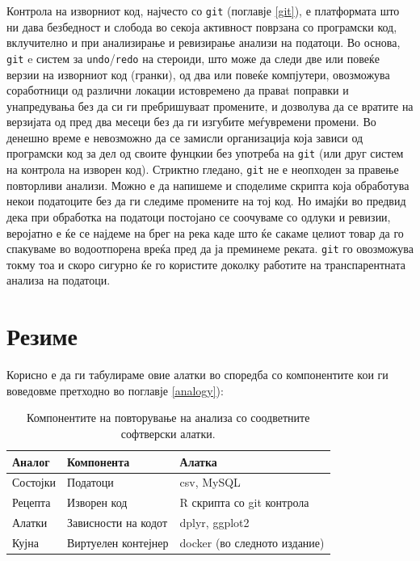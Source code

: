 \documentclass[
]{book}
\begin{document}
Контрола на изворниот код, најчесто со \texttt{git} (поглавје \ref{git}), е платформата што ни дава безбедност и слобода во секоја активност поврзана со програмски код, вклучително и при анализирање и ревизирање анализи на податоци. Во основа, \texttt{git} e систем за \texttt{undo}/\texttt{redo} на стероиди, што може да следи две или повеќе верзии на изворниот код (гранки), од два или повеќе компјутери, овозможува соработници од различни локации истовремено да праваt поправки и унапредувања без да си ги пребришуваат промените, и дозволува да се вратите на верзијата од пред два месеци без да ги изгубите меѓувремени промени. Во денешно време е невозможно да се замисли организација која зависи од програмски код за дел од своите фунцкии без употреба на \texttt{git} (или друг систем на контрола на изворен код). Стриктно гледано, \texttt{git} не е неопходен за правење повторливи анализи. Можно е да напишеме и споделиме скрипта која обработува некои податоците без да ги следиме промените на тој код. Но имајќи во предвид дека при обработка на податоци постојано се соочуваме со одлуки и ревизии, веројатно е ќе се најдеме на брег на река каде што ќе сакаме целиот товар да го спакуваме во водоотпорена вреќа пред да ја преминеме реката. \texttt{git} го овозможува токму тоа и скоро сигурно ќе го користите доколку работите на транспарентната анализа на податоци.

\hypertarget{ux440ux435ux437ux438ux43cux435-1}{%
\section{Резиме}\label{ux440ux435ux437ux438ux43cux435-1}}

Корисно е да ги табулираме овие алатки во споредба со компонентите кои ги воведовме претходно во поглавје \ref{analogy}):

\begin{table}

\caption{\label{tab:unnamed-chunk-2}Компонентите на повторување на анализа со соодветните софтверски алатки.}
\centering
\begin{tabular}[t]{l|l|l}
\hline
Аналог & Компонента & Алатка\\
\hline
Состојки & Податоци & csv, MySQL\\
\hline
Рецепта & Изворен код & R скрипта со git контрола\\
\hline
Алатки & Зависности на кодот & dplyr, ggplot2\\
\hline
Кујна & Виртуелен контејнер & docker (во следното издание)\\
\hline
\end{tabular}
\end{table}
\end{document}
